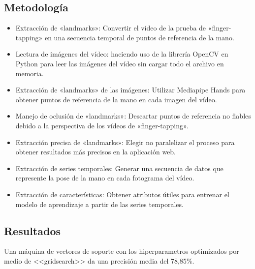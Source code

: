 \subsection{Metodología}
\begin{itemize}


\item Extracción de «landmarks»: Convertir el vídeo de la prueba de «finger-tapping» en una secuencia temporal de puntos de referencia de la mano.

\item Lectura de imágenes del vídeo: haciendo uso de la librería OpenCV en Python para leer las imágenes del vídeo sin cargar todo el archivo en memoria.

\item Extracción de «landmarks» de las imágenes: Utilizar Mediapipe Hands para obtener puntos de referencia de la mano en cada imagen del vídeo.

\item Manejo de oclusión de «landmarks»: Descartar puntos de referencia no fiables debido a la perspectiva de los vídeos de «finger-tapping».

\item Extracción precisa de «landmarks»: Elegir no paralelizar el proceso para obtener resultados más precisos en la aplicación web.

\item Extracción de series temporales: Generar una secuencia de datos que represente la pose de la mano en cada fotograma del vídeo.

\item Extracción de características: Obtener atributos útiles para entrenar el modelo de aprendizaje a partir de las series temporales.


\end{itemize}
\subsection{Resultados}
Una máquina de vectores de soporte con los hiperparametros optimizados por medio de <<gridsearch>> da una precisión media del 78,85\%.